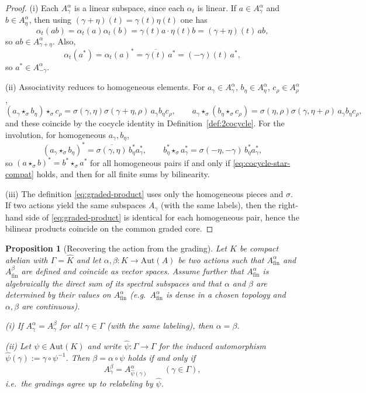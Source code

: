 \documentclass[11pt]{amsart}
\theoremstyle{plain}
\newtheorem{proposition}[theorem]{Proposition}
\theoremstyle{definition}
\theoremstyle{remark}
\begin{document}
\begin{proof}
(i) Each $A_\gamma^\alpha$ is a linear subspace, since each $\alpha_t$ is linear.
If $a\in A_\gamma^\alpha$ and $b\in A_\eta^\alpha$, then using $(\gamma+\eta)(t)=\gamma(t)\eta(t)$ one has
\[
\alpha_t(ab)=\alpha_t(a)\alpha_t(b)=\gamma(t)a\cdot\eta(t)b=(\gamma+\eta)(t)\,ab,
\]
so $ab\in A_{\gamma+\eta}^\alpha$. Also,
\[
\alpha_t(a^*)=\alpha_t(a)^*=\overline{\gamma(t)}\,a^*=(-\gamma)(t)\,a^*,
\]
so $a^*\in A_{-\gamma}^\alpha$.

(ii) Associativity reduces to homogeneous elements. For $a_\gamma\in A_\gamma^\alpha$, $b_\eta\in A_\eta^\alpha$, $c_\rho\in A_\rho^\alpha$,
\[
(a_\gamma\star_\sigma b_\eta)\star_\sigma c_\rho
=\sigma(\gamma,\eta)\sigma(\gamma+\eta,\rho)\,a_\gamma b_\eta c_\rho,
\qquad
a_\gamma\star_\sigma(b_\eta\star_\sigma c_\rho)
=\sigma(\eta,\rho)\sigma(\gamma,\eta+\rho)\,a_\gamma b_\eta c_\rho,
\]
and these coincide by the cocycle identity in Definition~\ref{def:2cocycle}.
For the involution, for homogeneous $a_\gamma,b_\eta$,
\[
(a_\gamma\star_\sigma b_\eta)^*=\overline{\sigma(\gamma,\eta)}\,b_\eta^* a_\gamma^*,
\qquad
b_\eta^*\star_\sigma a_\gamma^*=\sigma(-\eta,-\gamma)\,b_\eta^* a_\gamma^*,
\]
so $(a\star_\sigma b)^*=b^*\star_\sigma a^*$ for all homogeneous pairs if and only if \eqref{eq:cocycle-star-compat} holds,
and then for all finite sums by bilinearity.

(iii) The definition \eqref{eq:graded-product} uses only the homogeneous pieces and $\sigma$.
If two actions yield the same subspaces $A_\gamma$ (with the same labels), then the right-hand side of \eqref{eq:graded-product}
is identical for each homogeneous pair, hence the bilinear products coincide on the common graded core.
\end{proof}




\begin{proposition}[Recovering the action from the grading]\label{prop:B}
Let $K$ be compact abelian with $\Gamma=\widehat K$ and let $\alpha,\beta:K\to\mathrm{Aut}(A)$ be two actions such that
$A_{\mathrm{fin}}^\alpha$ and $A_{\mathrm{fin}}^\beta$ are defined and coincide as vector spaces.
Assume further that $A_{\mathrm{fin}}^\alpha$ is \emph{algebraically} the direct sum of its spectral subspaces and that
$\alpha$ and $\beta$ are determined by their values on $A_{\mathrm{fin}}^\alpha$ (e.g.\ $A_{\mathrm{fin}}^\alpha$ is dense in a chosen topology
and $\alpha,\beta$ are continuous).

\smallskip
\noindent (i) If $A_\gamma^\alpha=A_\gamma^\beta$ for all $\gamma\in\Gamma$ (with the same labeling), then $\alpha=\beta$.

\smallskip
\noindent (ii) Let $\psi\in\mathrm{Aut}(K)$ and write $\widehat\psi:\Gamma\to\Gamma$ for the induced automorphism
$\widehat\psi(\gamma):=\gamma\circ\psi^{-1}$.
Then $\beta=\alpha\circ\psi$ holds if and only if
\[
A_\gamma^\beta = A_{\widehat\psi(\gamma)}^\alpha\qquad(\gamma\in\Gamma),
\]
i.e.\ the gradings agree up to relabeling by $\widehat\psi$.
\end{proposition}
\end{document}
